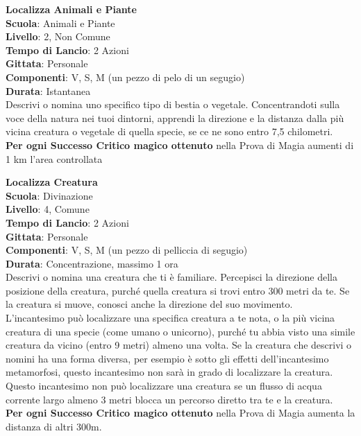 \begin{multicols}{2}
\medskip\textbf{Localizza Animali e Piante}\\
\textbf{Scuola}: Animali e Piante\\
\textbf{Livello}: 2, Non Comune\\
\textbf{Tempo di Lancio}: 2 Azioni\\
\textbf{Gittata}: Personale\\
\textbf{Componenti}: V, S, M (un pezzo di pelo di un segugio) \\
\textbf{Durata}: Istantanea\\
Descrivi o nomina uno specifico tipo di bestia o vegetale. Concentrandoti sulla voce della natura nei tuoi dintorni, apprendi la direzione e la distanza dalla più vicina creatura o vegetale di quella specie, se ce ne sono entro 7,5 chilometri.\\
\textbf{Per ogni Successo Critico magico ottenuto} nella Prova di Magia aumenti di 1 km l'area controllata

\medskip\textbf{Localizza Creatura}\\
\textbf{Scuola}: Divinazione\\
\textbf{Livello}: 4, Comune\\
\textbf{Tempo di Lancio}: 2 Azioni\\
\textbf{Gittata}: Personale\\
\textbf{Componenti}: V, S, M (un pezzo di pelliccia di segugio)\\
\textbf{Durata}: Concentrazione, massimo 1 ora\\
Descrivi o nomina una creatura che ti è familiare. Percepisci la direzione della posizione della creatura, purché quella creatura si trovi entro 300 metri da te. Se la creatura si muove, conosci anche la direzione del suo movimento.\\
L'incantesimo può localizzare una specifica creatura a te nota, o la più vicina creatura di una specie (come umano o unicorno), purché tu abbia visto una simile creatura da vicino (entro 9 metri) almeno una volta. Se la creatura che descrivi o nomini ha una forma diversa, per esempio è sotto gli effetti dell'incantesimo metamorfosi, questo incantesimo non sarà in grado di localizzare la creatura.\\
Questo incantesimo non può localizzare una creatura se un flusso di acqua corrente largo almeno 3 metri blocca un percorso diretto tra te e la creatura.\\
\textbf{Per ogni Successo Critico magico ottenuto} nella Prova di Magia aumenta la distanza di altri 300m.


\end{multicols}
